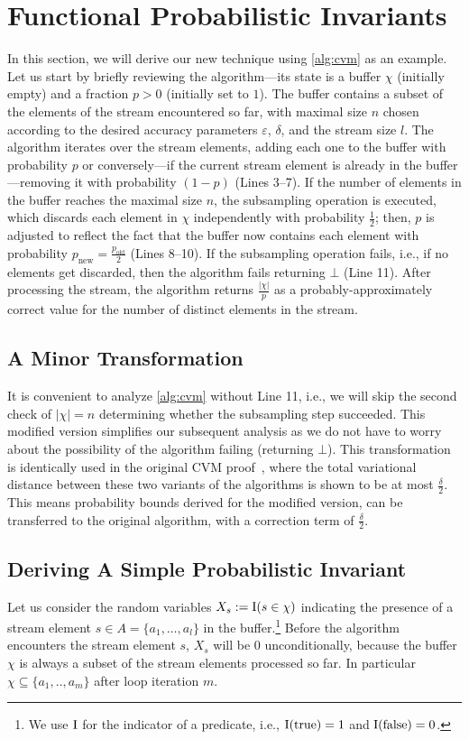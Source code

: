 \section{Functional Probabilistic Invariants}\label{sec:invariants}
In this section, we will derive our new technique using \cref{alg:cvm} as an example.
Let us start by briefly reviewing the algorithm---its state is a buffer $\chi$ (initially empty) and a fraction $p > 0$ (initially set to $1$).
The buffer contains a subset of the elements of the stream encountered so far, with maximal size $n$ chosen according to the desired accuracy parameters $\varepsilon$, $\delta$, and the stream size $l$.
The algorithm iterates over the stream elements, adding each one to the buffer with probability $p$ or conversely---if the current stream element is already in the buffer---removing it with probability $(1-p)$ (Lines 3--7).
If the number of elements in the buffer reaches the maximal size $n$, the subsampling operation is executed, which discards each element in $\chi$ independently with probability $\frac{1}{2}$; then, $p$ is adjusted to reflect the fact that the buffer now contains each element with probability $p_\text{new} = \frac{p_\text{old}}{2}$ (Lines 8--10).
If the subsampling operation fails, i.e., if no elements get discarded, then the algorithm fails returning $\bot$ (Line 11).
After processing the stream, the algorithm returns $\frac{|\chi|}{p}$ as a probably-approximately correct value for the number of distinct elements in the stream.

\subsection{A Minor Transformation}
It is convenient to analyze \cref{alg:cvm} without Line 11, i.e., we will skip the second check of $|\chi|=n$ determining whether the subsampling step succeeded.
This modified version simplifies our subsequent analysis as we do not have to worry about the possibility of the algorithm failing (returning $\bot$).
This transformation is identically used in the original CVM proof~\cite{chakraborty2023}, where the total variational distance between these two variants of the algorithms is shown to be at most $\frac{\delta}{2}$.
This means probability bounds derived for the modified version, can be transferred to the original algorithm, with a correction term of $\frac{\delta}{2}$.

\subsection{Deriving A Simple Probabilistic Invariant}
Let us consider the random variables $X_s := \operatorname{\mathrm{I}}(s \in \chi)$ indicating the presence of a stream element $s \in A = \{a_1,\ldots,a_l\}$ in the buffer.\footnote{We use $\operatorname{\mathrm{I}}$ for the indicator of a predicate, i.e., $\operatorname{\mathrm{I}}(\mathrm{true}) = 1$ and $\operatorname{\mathrm{I}}(\mathrm{false}) = 0$.}
Before the algorithm encounters the stream element $s$, $X_s$ will be $0$ unconditionally, because the buffer $\chi$ is always a subset of the stream elements processed so far.
In particular $\chi \subseteq \{a_1,..,a_m\}$ after loop iteration $m$.

